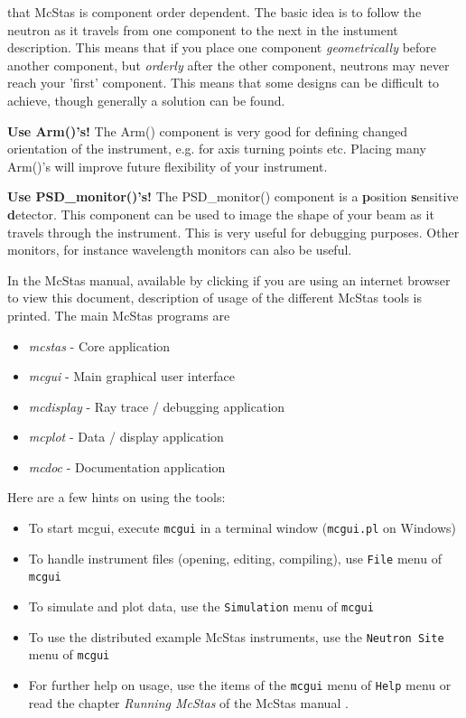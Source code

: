 \begin{itemize}
{{    that McStas is component order dependent. The basic idea is to
    follow the neutron as it travels from one component to the next in
    the instument description. This means that if you place one component
    \emph{geometrically} before another component, but \emph{orderly}
    after the other component, neutrons may never reach your 'first'
    component. This means that some designs can be difficult to
    achieve, though generally a solution can be found.}
\item{{\bf Use Arm()'s!} The Arm() component is very good for defining
  changed orientation of the instrument, e.g. for axis turning points
  etc. Placing many Arm()'s will improve future flexibility of your
  instrument.}
\item{{\bf Use PSD\_monitor()'s!} The PSD\_monitor() component is a
    {\bf p}osition {\bf s}ensitive {\bf d}etector. This component can
    be used to image the shape of your beam as it travels through the
    instrument. This is very useful for debugging purposes. Other
    monitors, for instance wavelength monitors can also be useful.}}
\end{itemize}
In the McStas manual, available by clicking
if you are using an internet browser to view this document, description
of usage of the different McStas tools is printed. The main McStas
programs are
\begin{itemize}
\item{\emph{mcstas} - Core application}
\item{\emph{mcgui} - Main graphical user interface}
\item{\emph{mcdisplay} - Ray trace / debugging application}
\item{\emph{mcplot} - Data / display application}
\item{\emph{mcdoc} - Documentation application}
\end{itemize}
Here are a few hints on using the tools:
\begin{itemize}
\item To start mcgui, execute \verb+mcgui+ in a terminal window
  (\verb+mcgui.pl+ on Windows)
\item To handle instrument files (opening, editing, compiling), use \verb+File+ menu of \verb+mcgui+
\item To simulate and plot data, use the \verb+Simulation+ menu of \verb+mcgui+
\item To use the distributed example McStas instruments, use the \verb+Neutron Site+ menu of \verb+mcgui+
\item For further help on usage, use the items of the \verb+mcgui+
  menu of \verb+Help+ menu or read the chapter \emph{Running McStas}
  of the McStas manual \cite{Manual}.
\end{itemize}
